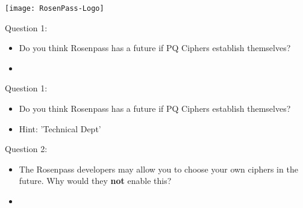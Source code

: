 \documentclass{rosenpass-beamer}
\begin{document}

\begin{frame}
\centering
\texttt{[image: RosenPass-Logo]}
\end{frame}

\printbibliography

\clearpage
\edef\totalcontentframes{\theframenumber}


\begin{frame}{Question 1:}
\begin{itemize}
  \item Do you think Rosenpass has a future if PQ Ciphers establish themselves?
  \item 
\end{itemize}
\end{frame}


\begin{frame}{Question 1:}
\begin{itemize}
  \item Do you think Rosenpass has a future if PQ Ciphers establish themselves?
  \item Hint: 'Technical Dept'
\end{itemize}
\end{frame}


\begin{frame}{Question 2:}
\begin{itemize}
  \item The Rosenpass developers may allow you to choose your own ciphers in the future.
    Why would they \textbf{not} enable this?
  \item 
\end{itemize}
\end{frame}

\end{document}

